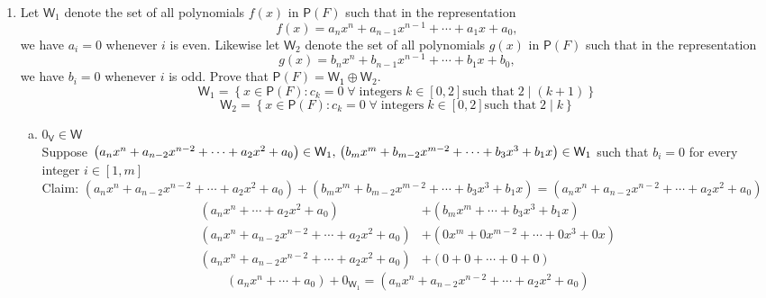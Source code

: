 \documentclass[letterpaper,12pt]{article}
\newcommand{\?}{\stackrel{?}{=}}
\begin{document}
\begin{spacing}{1.5}
\begin{enumerate}
\begin{enumerate}[(i)]
\end{enumerate}





\newpage{}
\setcounter{enumi}{24}
\item Let $\mathsf{W}_1$ denote the set of all polynomials $f(x)$ in
  $\mathsf{P}(F)$ such that in the representation
\[
f(x) = a_nx^n +a_{n-1}x^{n-1} + \cdots + a_1x+a_0,
\]
we have $a_i = 0$ whenever $i$ is even. Likewise let $\mathsf{W}_2$
denote the set of all polynomials $g(x)$ in $\mathsf{P}(F)$ such that
in the representation 
\[
g(x) = b_nx^n +b_{n-1}x^{n-1} + \cdots + b_1x+b_0,
\]
we have $b_i = 0$ whenever $i$ is odd. Prove that $\mathsf{P}(F) =
\mathsf{W_1} \oplus \mathsf{W}_2$.
\begin{equation}
\mathsf{W}_1 = \left\{x\in \mathsf{P}(F) \colon c_k = 0\; \forall\;
  \text{integers}\; k\in\left[0,2\right] \text{such that}\; 2\mid\left(k+1\right)\right\}
\end{equation}
\begin{equation}
\mathsf{W}_2 = \left\{x\in \mathsf{P}(F) \colon c_k = 0\; \forall\;
  \text{integers}\; k\in\left[0,2\right] \text{such that}\; 2\mid k\right\}
\end{equation}
\begin{enumerate}[(a)]
\item $0_\mathsf{V} \in \mathsf{W}$
\\
Suppose $\left(a_nx^n + a_{n-2}x^{n-2}+\cdots+ a_2x^2 + a_0\right) \in
\mathsf{W}_1,\\ \left(b_mx^m + b_{m-2}x^{m-2}+\cdots+ b_3x^3 + b_1x\right) \in
\mathsf{W}_1$ such that $b_i = 0$ for every integer
$i\in\left[1,m\right]$
\\
Claim: $\left(a_nx^n + a_{n-2}x^{n-2}+\cdots+ a_2x^2 + a_0\right) +
\left(b_mx^m + b_{m-2}x^{m-2}+\cdots+ b_3x^3 + b_1x\right) =
\left(a_nx^n + a_{n-2}x^{n-2}+\cdots+ a_2x^2 + a_0\right)$
\begin{align}
\left(a_nx^n +\cdots+ a_2x^2 + a_0\right) &+
\left(b_mx^m +\cdots+ b_3x^3 + b_1x\right)\\
\left(a_nx^n + a_{n-2}x^{n-2}+\cdots+ a_2x^2 + a_0\right) &+ \left(0x^m
  + 0x^{m-2}+\cdots+ 0x^3 + 0x\right)\\
\left(a_nx^n + a_{n-2}x^{n-2}+\cdots+ a_2x^2 + a_0\right) &+ \left(0
  + 0 +\cdots+ 0 + 0\right)
\end{align}
\begin{equation}
\left(a_nx^n +\cdots+ a_0\right) +
0_{\mathsf{W}_1} = \left(a_nx^n + a_{n-2}x^{n-2}+\cdots+ a_2x^2 + a_0\right)

\end{equation}
\end{enumerate}
\end{enumerate}
\end{spacing}
\end{document}
